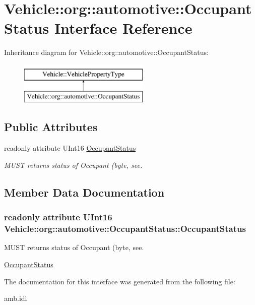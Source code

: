 \hypertarget{interfaceVehicle_1_1org_1_1automotive_1_1OccupantStatus}{\section{Vehicle\-:\-:org\-:\-:automotive\-:\-:Occupant\-Status Interface Reference}
\label{interfaceVehicle_1_1org_1_1automotive_1_1OccupantStatus}
}
Inheritance diagram for Vehicle\-:\-:org\-:\-:automotive\-:\-:Occupant\-Status\-:\begin{figure}[H]
\begin{center}
\leavevmode
\includegraphics[height=2.000000cm]{interfaceVehicle_1_1org_1_1automotive_1_1OccupantStatus}
\end{center}
\end{figure}
\subsection*{Public Attributes}
\begin{DoxyCompactItemize}
\item 
readonly attribute U\-Int16 \hyperlink{interfaceVehicle_1_1org_1_1automotive_1_1OccupantStatus_a3609eeb2e463eedee6ffdbe86a534631}{Occupant\-Status}
\begin{DoxyCompactList}\small\item\em M\-U\-S\-T returns status of Occupant (byte, see. \end{DoxyCompactList}\end{DoxyCompactItemize}


\subsection{Member Data Documentation}
\hypertarget{interfaceVehicle_1_1org_1_1automotive_1_1OccupantStatus_a3609eeb2e463eedee6ffdbe86a534631}{
\subsubsection[{Occupant\-Status}]{\setlength{\rightskip}{0pt plus 5cm}readonly attribute U\-Int16 Vehicle\-::org\-::automotive\-::\-Occupant\-Status\-::\-Occupant\-Status}}\label{interfaceVehicle_1_1org_1_1automotive_1_1OccupantStatus_a3609eeb2e463eedee6ffdbe86a534631}


M\-U\-S\-T returns status of Occupant (byte, see. 

\hyperlink{interfaceVehicle_1_1org_1_1automotive_1_1OccupantStatus}{Occupant\-Status} 

The documentation for this interface was generated from the following file\-:\begin{DoxyCompactItemize}
\item 
amb.\-idl\end{DoxyCompactItemize}
